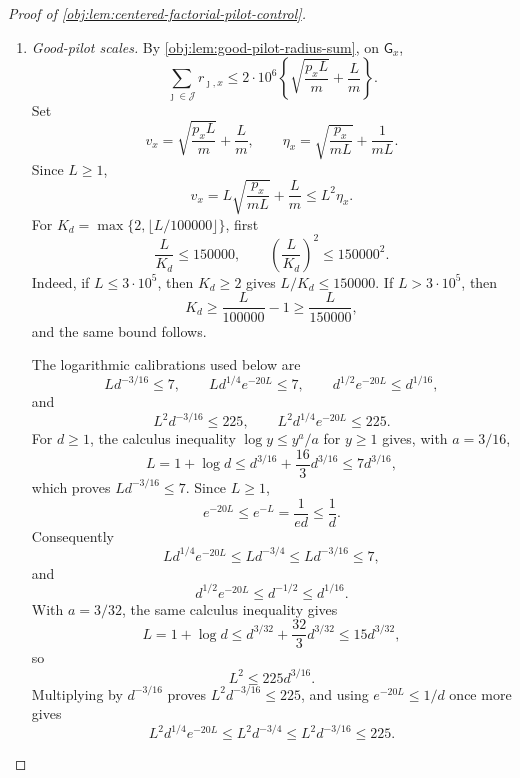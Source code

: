 \begin{proof}[Proof of \cref{obj:lem:centered-factorial-pilot-control}]
\begin{enumerate}
\cref{obj:def:jackson-factorial-estimator} therefore gives
\[
|T_x^{\mathrm{JF}}-\bar f_\epsilon(q_x)|
\le
F\|b_x-q_x\|_1+d^{1/4}F\sum_{\jmath\in\mathcal J}r_{\jmath,x}
\le
2d^{1/4}F\,\Gamma_x(N').
\]
With \(\mu_x^{\mathrm{pil}}=\bigotimes_{\jmath}\operatorname{Pois}(m q_\jmath)\) and
\(\mu_x^{\mathrm{eval}}=\bigotimes_{\jmath}\operatorname{Pois}(m q_\jmath)\), set
\[
\mathrm{PF}_{1,x}
=
\int_{\mathsf G_x^c}
|T_x^{\mathrm{JF}}-\bar f_\epsilon(q_x)|
\,d(\mu_x^{\mathrm{pil}}\otimes\mu_x^{\mathrm{eval}})
\]
and
\[
\mathrm{PF}_{2,x}
=
\int_{\mathsf G_x^c}
(T_x^{\mathrm{JF}}-\bar f_\epsilon(q_x))^2
\,d(\mu_x^{\mathrm{pil}}\otimes\mu_x^{\mathrm{eval}}).
\]

\item \emph{Good-pilot scales.}
By \cref{obj:lem:good-pilot-radius-sum}, on \(\mathsf G_x\),
\[
\sum_{\jmath\in\mathcal J}r_{\jmath,x}
\le
2\cdot10^6
\left\{\sqrt{\frac{p_xL}{m}}+\frac Lm\right\}.
\]
Set
\[
v_x=\sqrt{\frac{p_xL}{m}}+\frac Lm,\qquad
\eta_x=\sqrt{\frac{p_x}{mL}}+\frac1{mL}.
\]
Since \(L\ge1\),
\[
v_x=L\sqrt{\frac{p_x}{mL}}+\frac Lm\le L^2\eta_x.
\]
For \(K_d=\max\{2,\lfloor L/100000\rfloor\}\), first
\[
\frac L{K_d}\le150000,
\qquad
\left(\frac L{K_d}\right)^2\le150000^2 .
\]
Indeed, if \(L\le3\cdot10^5\), then \(K_d\ge2\) gives \(L/K_d\le150000\).  If
\(L>3\cdot10^5\), then
\[
K_d\ge \frac L{100000}-1\ge \frac L{150000},
\]
and the same bound follows.

The logarithmic calibrations used below are
\[
L d^{-3/16}\le7,
\qquad
L d^{1/4}e^{-20L}\le7,
\qquad
d^{1/2}e^{-20L}\le d^{1/16},
\]
and
\[
L^2d^{-3/16}\le225,
\qquad
L^2d^{1/4}e^{-20L}\le225 .
\]
For \(d\ge1\), the calculus inequality \(\log y\le y^a/a\) for \(y\ge1\) gives, with
\(a=3/16\),
\[
L=1+\log d\le d^{3/16}+\frac{16}{3}d^{3/16}\le7d^{3/16},
\]
which proves \(Ld^{-3/16}\le7\).  Since \(L\ge1\),
\[
e^{-20L}\le e^{-L}=\frac1{ed}\le\frac1d .
\]
Consequently
\[
Ld^{1/4}e^{-20L}\le Ld^{-3/4}\le Ld^{-3/16}\le7,
\]
and
\[
d^{1/2}e^{-20L}\le d^{-1/2}\le d^{1/16}.
\]
With \(a=3/32\), the same calculus inequality gives
\[
L=1+\log d\le d^{3/32}+\frac{32}{3}d^{3/32}\le15d^{3/32},
\]
so
\[
L^2\le225d^{3/16}.
\]
Multiplying by \(d^{-3/16}\) proves \(L^2d^{-3/16}\le225\), and using
\(e^{-20L}\le1/d\) once more gives
\[
L^2d^{1/4}e^{-20L}\le L^2d^{-3/4}
\le L^2d^{-3/16}\le225 .
\]


\end{enumerate}
\end{proof}
